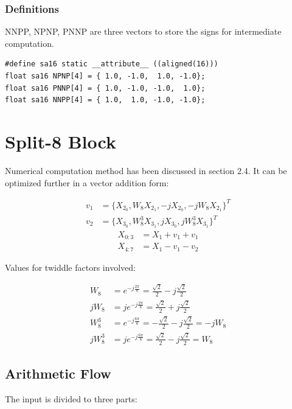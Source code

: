 \documentclass[a4paper]{report}
\begin{document}
\subsubsection{Definitions} \indent

	NNPP, NPNP, PNNP are three vectors to store the signs for intermediate computation.

    \lstset{language = c, tabsize = 4}
    \begin{lstlisting}
#define sa16 static __attribute__ ((aligned(16)))
float sa16 NPNP[4] = { 1.0, -1.0,  1.0, -1.0};
float sa16 PNNP[4] = { 1.0, -1.0, -1.0,  1.0};
float sa16 NNPP[4] = { 1.0,  1.0, -1.0, -1.0};
    \end{lstlisting}

\section{Split-8 Block} \indent

	Numerical computation method has been discussed in section 2.4. It can be optimized further in a vector addition form:

\begin{align*}
v_1 &= \{X_{2_0}, W_8 X_{2_1}, -jX_{2_0}, -jW_8 X_{2_1}\}^T\\
v_2 &= \{X_{3_0}, W^3_8 X_{3_1}, jX_{3_0}, jW^3_8 X_{3_1}\}^T
\end{align*}
\begin{align*}
X_{0:3} &= X_1 + v_1 + v_1\\
X_{4:7} &= X_1 - v_1 - v_2
\end{align*}

	Values for twiddle factors involved:

\newcommand{\tsqft}{\frac{\sqrt{2}}{2}}
\[\begin{split}
	W_8 & = e^{-j\frac{2\pi}{8}} = \tsqft - j\tsqft\\
	jW_8 & = je^{-j\frac{2\pi}{8}} = \tsqft + j\tsqft\\
	W^3_8 & = e^{-j\frac{6\pi}{8}} = -\tsqft - j\tsqft = -jW_8\\
	jW^3_8 & = je^{-j\frac{6\pi}{8}} = \tsqft - j\tsqft = W_8
\end{split}\]

\subsection{Arithmetic Flow} \indent

	The input is divided to three parts: 
\end{document}
